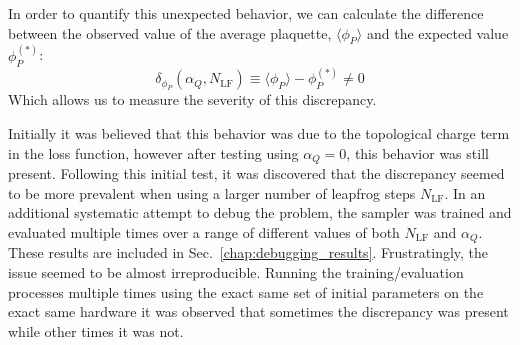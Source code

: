 \documentclass[main.tex]{subfiles}
\begin{document}
%
In order to quantify this unexpected behavior, we can calculate the difference between the observed value of the
average plaquette, $\langle \phi_{P}\rangle$ and the expected value $\phi_{P}^{(*)}$:
% 
\begin{equation}
  {\delta_{\phi_P}}(\alpha_Q, N_{\mathrm{LF}}) \equiv \langle \phi_P\rangle - \phi_{P}^{(*)} \neq 0
\end{equation}
%
Which allows us to measure the severity of this discrepancy.%
%
%

Initially it was believed that this behavior was due to the topological charge term in the loss function, however after
testing using $\alpha_{Q} = 0$, this behavior was still present.
%
Following this initial test, it was discovered that the discrepancy seemed to be more prevalent when using a larger
number of leapfrog steps $N_{\mathrm{LF}}$.
%
In an additional systematic attempt to debug the problem, the sampler was trained and evaluated multiple times over a
range of different values of both $N_{\mathrm{LF}}$ and $\alpha_{Q}$.
%
These results are included in Sec.~\ref{chap:debugging_results}.
%
Frustratingly, the issue seemed to be almost irreproducible.
%
Running the training/evaluation processes multiple times using the exact same set of initial parameters on the exact
same hardware it was observed that sometimes the discrepancy was present while other times it was not.

%
\end{document}
